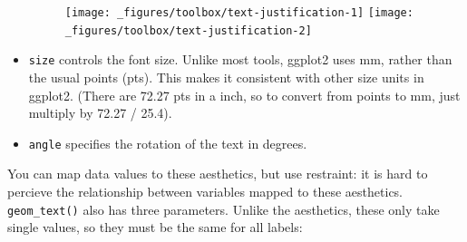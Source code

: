 \begin{itemize}
  \begin{figure}[H]
    \texttt{[image: \_figures/toolbox/text-justification-1]}%
    \texttt{[image: \_figures/toolbox/text-justification-2]}
  \end{figure}
\item
  \texttt{size} controls the font size. Unlike most tools, ggplot2 uses
  mm, rather than the usual points (pts). This makes it consistent with
  other size units in ggplot2. (There are 72.27 pts in a inch, so to
  convert from points to mm, just multiply by 72.27 / 25.4).
\item
  \texttt{angle} specifies the rotation of the text in degrees.
\end{itemize}

You can map data values to these aesthetics, but use restraint: it is
hard to percieve the relationship between variables mapped to these
aesthetics. \texttt{geom\_text()} also has three parameters. Unlike the
aesthetics, these only take single values, so they must be the same for
all labels:

